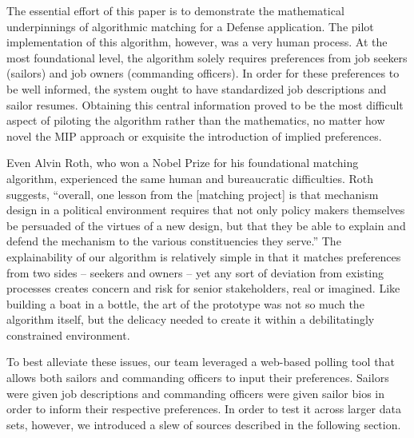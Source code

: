 The essential effort of this paper is to demonstrate the mathematical underpinnings of algorithmic matching for a Defense application. The pilot implementation of this algorithm, however, was a very human process. At the most foundational level, the algorithm solely requires preferences from job seekers (sailors) and job owners (commanding officers). In order for these preferences to be well informed, the system ought to have standardized job descriptions and sailor resumes.  Obtaining this central information proved to be the most difficult aspect of piloting the algorithm rather than the mathematics, no matter how novel the MIP approach or exquisite the introduction of implied preferences. 

Even Alvin Roth, who won a Nobel Prize for his foundational matching algorithm, experienced the same human and bureaucratic difficulties. Roth suggests, ``overall, one lesson from the [matching project] is that mechanism design in a political environment requires that not only policy makers themselves be persuaded of the virtues of a new design, but that they be able to explain and defend the mechanism to the various constituencies they serve.''
\cite{2006_Atila} The explainability of our algorithm is relatively simple in that it matches preferences from two sides -- seekers and owners -- yet any sort of deviation from existing processes creates concern and risk for senior stakeholders, real or imagined. Like building a boat in a bottle, the art of the prototype was not so much the algorithm itself, but the delicacy needed to create it within a debilitatingly constrained environment.

To best alleviate these issues, our team leveraged a web-based polling tool that allows both sailors and commanding officers to input their preferences. Sailors were given job descriptions and commanding officers were given sailor bios in order to inform their respective preferences.  In order to test it across larger data sets, however, we introduced a slew of sources described in the following section. 
